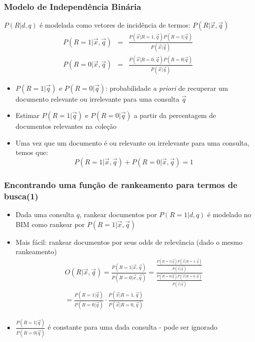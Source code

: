 \documentclass[compress]{beamer}
\begin{document}
\begin{frame}

\frametitle{Modelo de Independência Binária}

$P(R|d,q)$  é modelada como vetores de incidência de termos: $P(R|\vec{x}, \vec{q})$
\begin{eqnarray}
\nonumber
P(R=1|\vec{x}, \vec{q}) &=& \frac{P(\vec{x}|R=1, \vec{q})P(R=1|\vec{q})}{P(\vec{x}|\vec{q})} \label{Rxq-bayes2} \\
P(R=0|\vec{x}, \vec{q}) &=& \frac{P(\vec{x}|R=0, \vec{q})P(R=0|\vec{q})}{P(\vec{x}|\vec{q})} \nonumber
\end{eqnarray}
\begin{itemize}
\pause
\item $P(R=1|\vec{q})$ e $P(R=0|\vec{q})$: probabilidade \textit{a priori} de recuperar um documento relevante ou irrelevante para uma consulta $\vec{q}$
\pause
\item Estimar $P(R=1|\vec{q})$ e $P(R=0|\vec{q})$ a partir da percentagem de documentos relevantes na coleção
\pause
\item Uma vez que um documento é ou relevante ou irrelevante para uma consulta, temos que:
\pause
\begin{equation}
\nonumber
P(R=1|\vec{x}, \vec{q}) + P(R=0|\vec{x},\vec{q}) = 1
\end{equation}
\end{itemize}
\end{frame}
\begin{frame}
\frametitle{Encontrando uma função de rankeamento para termos de busca(1)}
\pause[2]

\begin{itemize}
\item Dada uma consulta $q$, rankear documentos por $P(R=1|d,q)$ é modelado no BIM como rankear por $P(R=1|\vec{x},\vec{q})$

\item Mais fácil: rankear documentos por seus odds de relevância (dado o mesmo rankeamento)
\begin{eqnarray}
\nonumber
O(R|\vec{x},\vec{q})
= \frac{P(R=1|\vec{x},\vec{q})}{P(R=0|\vec{x},\vec{q})}
= \frac{\frac{P(R=1|\vec{q})P(\vec{x}|R=1,\vec{q})}{P(\vec{x}|\vec{q})}}{\frac{P(R=0|\vec{q})P(\vec{x}|R=0,\vec{q})}{P(\vec{x}|\vec{q})}}\\
\nonumber
 = \frac{P(R=1|\vec{q})}{P(R=0|\vec{q})}\cdot \frac{P(\vec{x}|R=1,\vec{q})}{P(\vec{x}|R=0,\vec{q})} 
\end{eqnarray}

\item $\frac{P(R=1|\vec{q})}{P(R=0|\vec{q})}$ é constante para uma dada consulta - pode ser ignorado
\end{itemize}
\end{frame}
\end{document}
